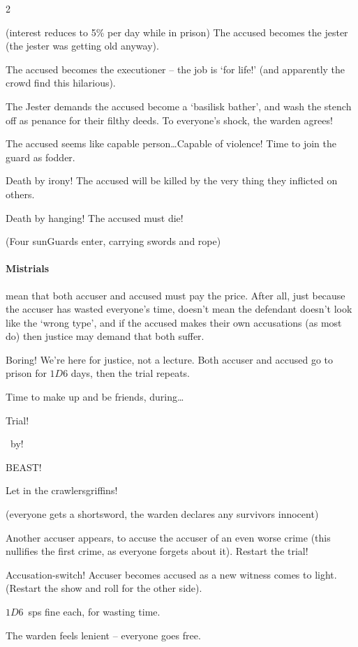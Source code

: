 \begin{multicols}{2}
\begin{dlist}
    (interest reduces to 5\% per day while in prison)
  \else
    The accused becomes the jester (the jester was getting old anyway).
  \fi
  \item
    The accused becomes the executioner -- the job is `for life!' (and apparently the crowd find this hilarious).
  \item
    The Jester demands the accused become a `\gls{basilisk} bather', and wash the stench off  as penance for their filthy deeds.
    To everyone's shock, the \gls{warden} agrees!
  \item
  The accused seems like capable person\ldots Capable of violence!
  Time to join the \gls{guard} as fodder.
  \item
  Death by irony!
  The accused will be killed by the very thing they inflicted on others.
  \item
  Death by hanging!
  The accused must die!

  (Four \glspl{sunGuard} enter, carrying swords and rope)
\end{dlist}

\paragraph{Mistrials}
mean that both accuser and accused must pay the price.
After all, just because the accuser has wasted everyone's time, doesn't mean the defendant doesn't look like the `wrong type', and if the accused makes their own accusations (as most do) then justice may demand that both suffer.

\vspace{2em}\null

\label{mistrials}
\begin{dlist}
  \item
  Boring!
  We're here for justice, not a lecture.
  Both accuser and accused go to prison for $1D6$ days, then the trial repeats.
  \item
  Time to make up and be friends, during\ldots

  Trial!

  ~by!

  BEAST!

  Let in the \ifodd\value{r4} \glspl{crawler}\else \glspl{griffin}\fi!

  (everyone gets a shortsword, the \gls{warden} declares any survivors innocent)
  \item
  Another accuser appears, to accuse the accuser of an even worse crime (this nullifies the first crime, as everyone forgets about it).
  Restart the trial!
  \item
  Accusation-switch!
  Accuser becomes accused as a new witness comes to light.
  (Restart the show and roll for the other side).
  \item
  $1D6$~\glspl{sp} fine each, for wasting time.
  \item
  The \gls{warden} feels lenient -- everyone goes free.
\end{dlist}

\end{multicols}

\encTownEvents

